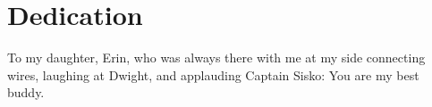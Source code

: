 \chapter*{Dedication}

To my daughter, Erin, who was always there with me at my side connecting wires, laughing at Dwight, and applauding Captain Sisko: You are my best buddy. %